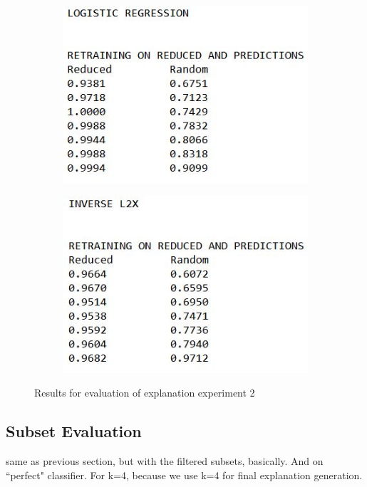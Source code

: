 \begin{figure}[H]
	\begin{subfigure}[b]{0.4\textwidth}
		\includegraphics[width=\textwidth]{img/expleval2_logreg.JPG}
	\end{subfigure}
	\begin{subfigure}[b]{0.4\textwidth}
		\includegraphics[width=\textwidth]{img/expleval2_invL2X.JPG}
	\end{subfigure}
	\caption{Results for evaluation of explanation experiment 2}
	\label{fig:results_expleval2}
\end{figure}


\subsection{Subset Evaluation}
same as previous section, but with the filtered subsets, basically. And on ``perfect" classifier. For k=4, because we use k=4 for final explanation generation.